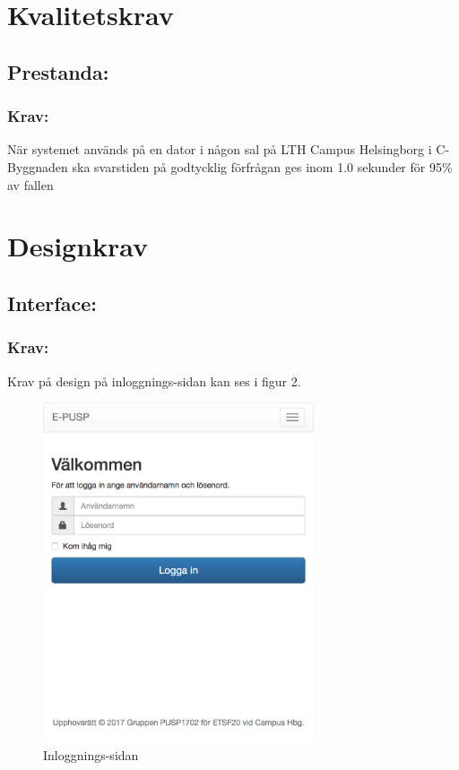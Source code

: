 \documentclass[paper=a4, fontsize=11pt,twoside]{article}
\begin{document}
\section{Kvalitetskrav}
\subsection{Prestanda:}
\subsubsection{Krav:}
När systemet används på en dator i någon sal på LTH Campus Helsingborg i C-Byggnaden ska svarstiden på godtycklig förfrågan ges inom 1.0 sekunder för 95\% av fallen




\section{Designkrav}
\subsection{Interface:}
\subsubsection{Krav:} Krav på design på inloggnings-sidan kan ses i figur 2.
\begin{figure}[H]
\centering
\includegraphics[width=8cm]{login}
\caption{Inloggnings-sidan}
\end{figure}
\end{document}
